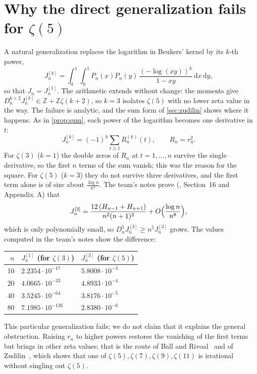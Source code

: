 \documentclass[11pt]{article}
\newcommand{\Z}{\mathbb{Z}}
\newcommand{\dd}{\,\mathrm{d}}
\newcommand{\Dn}{D_n}
\theoremstyle{plain}
\theoremstyle{definition}
\theoremstyle{remark}
\begin{document}
\section{Why the direct generalization fails for \texorpdfstring{$\zeta(5)$}{zeta(5)}}\label{sec:zeta5}

A natural generalization replaces the logarithm in Beukers' kernel by its
$k$-th power,
\[
  J_n^{[k]}=\int_0^1\!\!\int_0^1P_n(x)P_n(y)\,\frac{(-\log(xy))^k}{1-xy}\dd x\dd y,
\]
so that $J_n=J_n^{[1]}$. The arithmetic extends without change: the moments give
$\Dn^{k+2}J_n^{[k]}\in\Z+\Z\zeta(k+2)$, so $k=3$ isolates $\zeta(5)$ with no lower zeta value in the
way. The failure is analytic, and the sum form of \cref{sec:zudilin} shows where it happens.
As in \cref{prop:sum}, each power of the logarithm becomes one derivative in $t$:
\[
  J_n^{[k]}=(-1)^k\sum_{t\ge1}R_n^{(k)}(t),\qquad R_n=r_n^2 .
\]
For $\zeta(3)$ ($k=1$) the double zeros of $R_n$ at $t=1,\dots,n$ survive the single derivative, so
the first $n$ terms of the sum vanish; this was the reason for the square. For $\zeta(5)$ ($k=3$) they
do not survive three derivatives, and the first term alone is of size about $\frac{\log n}{n^4}$. The
team's notes prove (\cite{codexnotes}, Section~16 and Appendix~A) that
\[
  J_n^{[3]}=\frac{12\,(H_{n-1}+H_{n+1})}{n^2(n+1)^2}+O\Bigl(\frac{\log n}{n^8}\Bigr),
\]
which is only polynomially small, so $\Dn^5J_n^{[3]}\ge n^5J_n^{[3]}$ grows. The values computed in
the team's notes show the difference:
\begin{center}
\begin{tabular}{@{}rll@{}}
\toprule
$n$ & $J_n^{[1]}$ (for $\zeta(3)$) & $J_n^{[3]}$ (for $\zeta(5)$)\\
\midrule
10 & $2.2354\cdot10^{-17}$ & $5.8008\cdot10^{-3}$\\
20 & $4.0665\cdot10^{-33}$ & $4.8933\cdot10^{-4}$\\
40 & $3.5245\cdot10^{-64}$ & $3.8176\cdot10^{-5}$\\
80 & $7.1985\cdot10^{-126}$ & $2.8380\cdot10^{-6}$\\
\bottomrule
\end{tabular}
\end{center}
This particular generalization fails; we do not claim that it explains the general obstruction.
Raising $r_n$ to higher powers restores the vanishing of the first terms but brings in other zeta
values; that is the route of Ball and Rivoal~\cite{ballrivoal,rivoal} and of Zudilin~\cite{zudilinodd},
which shows that one of $\zeta(5),\zeta(7),\zeta(9),\zeta(11)$ is irrational without singling out
$\zeta(5)$.
\end{document}
